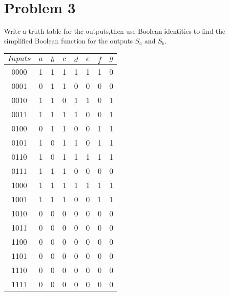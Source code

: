 \documentclass{article}
\begin{document}
    \section{Problem 3}
    \begin{flushleft}
        Write a truth table for the outputs,then use Boolean identities to find the simplified
        Boolean function for the outputs $S_a$ and $S_b$.
    \end{flushleft}
    \begin{center}
            \begin{tabular}{|c|c|c|c|c|c|c|c|}
                \hline
                $Inputs$ & $a$ & $b$ & $c$ & $d$ & $e$ & $f$ & $g$ \\
                \hline
                0000 & 1 & 1 & 1 & 1 & 1 & 1 & 0 \\
                0001 & 0 & 1 & 1 & 0 & 0 & 0 & 0 \\
                0010 & 1 & 1 & 0 & 1 & 1 & 0 & 1 \\
                0011 & 1 & 1 & 1 & 1 & 0 & 0 & 1 \\
                0100 & 0 & 1 & 1 & 0 & 0 & 1 & 1 \\
                0101 & 1 & 0 & 1 & 1 & 0 & 1 & 1 \\
                0110 & 1 & 0 & 1 & 1 & 1 & 1 & 1 \\
                0111 & 1 & 1 & 1 & 0 & 0 & 0 & 0 \\
                1000 & 1 & 1 & 1 & 1 & 1 & 1 & 1 \\
                1001 & 1 & 1 & 1 & 0 & 0 & 1 & 1 \\
                1010 & 0 & 0 & 0 & 0 & 0 & 0 & 0 \\
                1011 & 0 & 0 & 0 & 0 & 0 & 0 & 0 \\
                1100 & 0 & 0 & 0 & 0 & 0 & 0 & 0 \\
                1101 & 0 & 0 & 0 & 0 & 0 & 0 & 0 \\
                1110 & 0 & 0 & 0 & 0 & 0 & 0 & 0 \\
                1111 & 0 & 0 & 0 & 0 & 0 & 0 & 0 \\
                \hline
            \end{tabular}
    \end{center}
    \newpage
\end{document}
